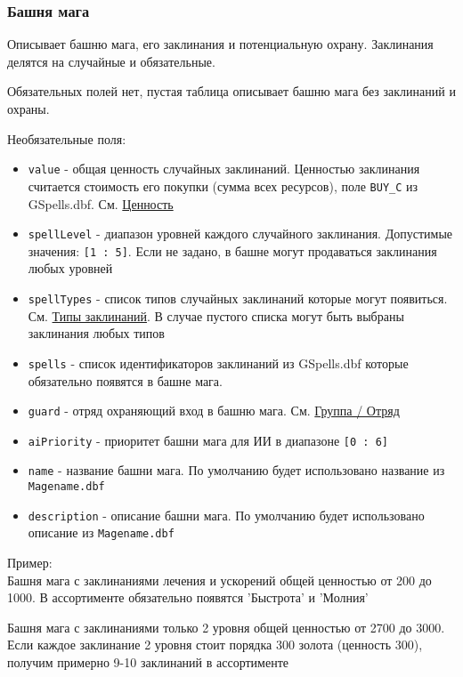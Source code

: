 \subsubsection{Башня мага}
\label{mage}
Описывает башню мага, его заклинания и потенциальную охрану. Заклинания делятся на случайные и обязательные.

Обязательных полей нет, пустая таблица описывает башню мага без заклинаний и охраны.

Необязательные поля:
\begin{itemize}
\item \texttt{value} - общая ценность случайных заклинаний. Ценностью заклинания считается стоимость его покупки (сумма всех ресурсов), поле \texttt{BUY\_C} из GSpells.dbf.  См. \hyperref[value]{Ценность}
\item \texttt{spellLevel} - диапазон уровней каждого случайного заклинания. Допустимые значения: \texttt{[1 : 5]}. Если не задано, в башне могут продаваться заклинания любых уровней
\item \texttt{spellTypes} - список типов случайных заклинаний которые могут появиться. См. \hyperref[spellTypes]{Типы заклинаний}. В случае пустого списка могут быть выбраны заклинания любых типов
\item \texttt{spells} - список идентификаторов заклинаний из GSpells.dbf которые обязательно появятся в башне мага.
\item \texttt{guard} - отряд охраняющий вход в башню мага. См. \hyperref[group]{Группа / Отряд}
\item \texttt{aiPriority} - приоритет башни мага для ИИ в диапазоне \texttt{[0 : 6]}
\item \texttt{name} - название башни мага. По умолчанию будет использовано название из \texttt{Magename.dbf}
\item \texttt{description} - описание башни мага. По умолчанию будет использовано описание из \texttt{Magename.dbf}
\end{itemize}

Пример:\\
Башня мага с заклинаниями лечения и ускорений общей ценностью от 200 до 1000.
В ассортименте обязательно появятся 'Быстрота' и 'Молния'

\begin{figure}[H]

\end{figure}

Башня мага с заклинаниями только 2 уровня общей ценностью от 2700 до 3000.
Если каждое заклинание 2 уровня стоит порядка 300 золота (ценность 300),
получим примерно 9-10 заклинаний в ассортименте

\begin{figure}[H]

\end{figure}